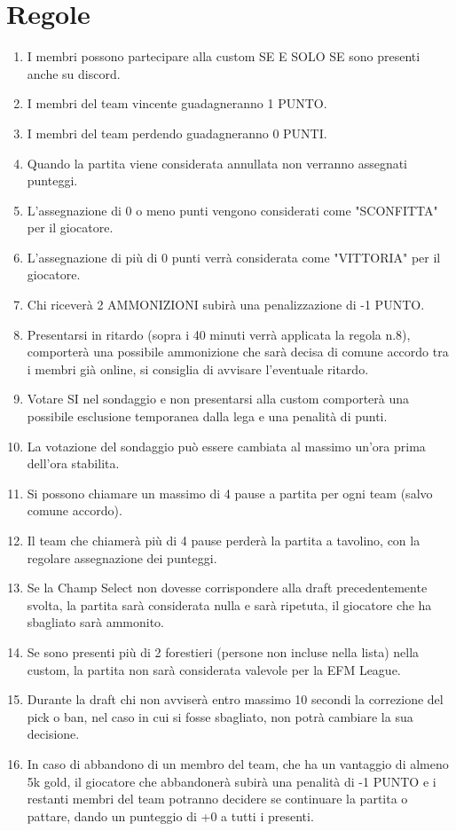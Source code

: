 \documentclass[a4paper, 12pt]{report}
\begin{document}
\section*{Regole}
\begin{enumerate}
  \item I membri possono partecipare alla custom SE E SOLO SE sono presenti anche su discord.
  \item I membri del team vincente guadagneranno 1 PUNTO.
  \item I membri del team perdendo guadagneranno 0 PUNTI.
  \item Quando la partita viene considerata annullata non verranno assegnati punteggi.
  \item L'assegnazione di 0 o meno punti vengono considerati come "SCONFITTA" per il giocatore.
  \item L'assegnazione di più di 0 punti verrà considerata come "VITTORIA" per il giocatore.
  \item Chi riceverà 2 AMMONIZIONI subirà una penalizzazione di -1 PUNTO.
  \item Presentarsi in ritardo (sopra i 40 minuti verrà applicata la regola n.8), comporterà una possibile ammonizione che sarà decisa di comune accordo tra i membri già online, si consiglia di avvisare l'eventuale ritardo.
  \item Votare SI nel sondaggio e non presentarsi alla custom comporterà una possibile esclusione temporanea dalla lega e una penalità di punti.
  \item La votazione del sondaggio può essere cambiata al massimo un'ora prima dell'ora stabilita.
  \item Si possono chiamare un massimo di 4 pause a partita per ogni team (salvo comune accordo).
  \item Il team che chiamerà più di 4 pause perderà la partita a tavolino, con la regolare assegnazione dei punteggi.
  \item Se la Champ Select non dovesse corrispondere alla draft precedentemente svolta, la partita sarà considerata nulla e sarà ripetuta, il giocatore che ha sbagliato sarà ammonito.
  \item Se sono presenti più di 2 forestieri (persone non incluse nella lista) nella custom, la partita non sarà considerata valevole per la EFM League.
  \item Durante la draft chi non avviserà entro massimo 10 secondi la correzione del pick o ban, nel caso in cui si fosse sbagliato, non potrà cambiare la sua decisione.
  \item In caso di abbandono di un membro del team, che ha un vantaggio di almeno 5k gold, il giocatore che abbandonerà subirà una penalità di -1 PUNTO e i restanti membri del team potranno decidere se continuare la partita o pattare, dando un punteggio di +0 a tutti i presenti.

\end{enumerate}
\end{document}
